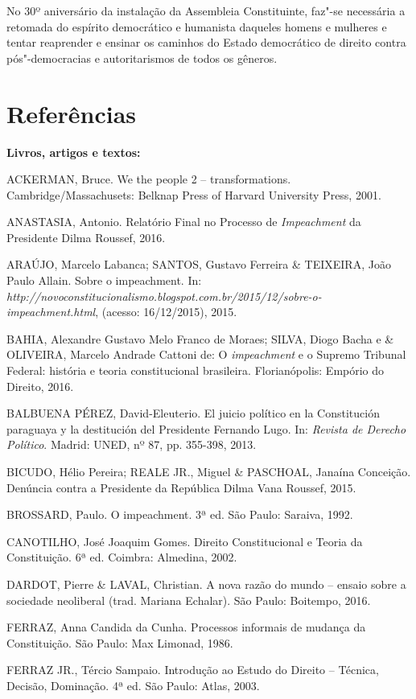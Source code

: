 No 30º aniversário da instalação da Assembleia Constituinte, faz"-se
necessária a retomada do espírito democrático e humanista daqueles
homens e mulheres e tentar reaprender e ensinar os caminhos do Estado
democrático de direito contra pós"-democracias e autoritarismos de todos
os gêneros.

\section{Referências}

\textbf{Livros, artigos e textos:}

ACKERMAN, Bruce. We the people 2 -- transformations.
Cambridge/Massachusets: Belknap Press of Harvard University Press, 2001.

ANASTASIA, Antonio. Relatório Final no Processo de \emph{Impeachment} da
Presidente Dilma Roussef, 2016.

ARAÚJO, Marcelo Labanca; SANTOS, Gustavo Ferreira \& TEIXEIRA, João
Paulo Allain. Sobre o impeachment. In:
\emph{http://novoconstitucionalismo.blogspot.com.br/2015/12/sobre-o-impeachment.html},
(acesso: 16/12/2015), 2015.

BAHIA, Alexandre Gustavo Melo Franco de Moraes; SILVA, Diogo Bacha e \&
OLIVEIRA, Marcelo Andrade Cattoni de: O \emph{impeachment} e o Supremo
Tribunal Federal: história e teoria constitucional brasileira.
Florianópolis: Empório do Direito, 2016.

BALBUENA PÉREZ, David-Eleuterio. El juicio político en la Constitución
paraguaya y la destitución del Presidente Fernando Lugo. In:
\emph{Revista de Derecho Político}. Madrid: UNED, nº 87, pp. 355-398,
2013.

BICUDO, Hélio Pereira; REALE JR., Miguel \& PASCHOAL, Janaína Conceição.
Denúncia contra a Presidente da República Dilma Vana Roussef, 2015.

BROSSARD, Paulo. O impeachment. 3ª ed. São Paulo: Saraiva, 1992.

CANOTILHO, José Joaquim Gomes. Direito Constitucional e Teoria da
Constituição. 6ª ed. Coimbra: Almedina, 2002.

DARDOT, Pierre \& LAVAL, Christian. A nova razão do mundo -- ensaio
sobre a sociedade neoliberal (trad. Mariana Echalar). São Paulo:
Boitempo, 2016.

FERRAZ, Anna Candida da Cunha. Processos informais de mudança da
Constituição. São Paulo: Max Limonad, 1986.

FERRAZ JR., Tércio Sampaio. Introdução ao Estudo do Direito -- Técnica,
Decisão, Dominação. 4ª ed. São Paulo: Atlas, 2003.

